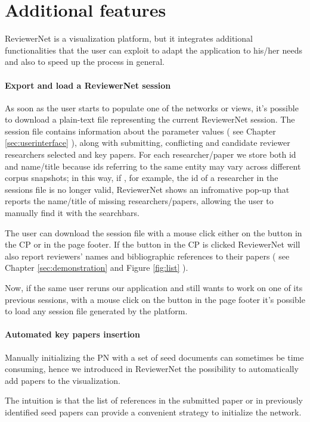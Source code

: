 \section{Additional features}\label{sec:misccode}
ReviewerNet is a visualization platform, but it integrates additional functionalities that the user can exploit to adapt the application to his/her needs and also to speed up the process in general.

\paragraph*{Export and load a ReviewerNet session}
As soon as the user starts to populate one of the networks or views, it's possible to download a plain-text file representing the current ReviewerNet session. The session file contains information about the parameter values ( see Chapter \ref{sec:userinterface} ), along with submitting, conflicting and candidate reviewer researchers selected and key papers. For each researcher/paper we store both id and name/title because ids referring to the same entity may vary across different corpus snapshots; in this way, if , for example, the id of a researcher in the sessions file is no longer valid, ReviewerNet shows an infromative pop-up that reports the name/title of missing researchers/papers, allowing the user to manually find it with the searchbars.     

The user can download the session file with a mouse click either on the  button in the CP or in the page footer. If the button in the CP is clicked ReviewerNet will also report reviewers’ names and bibliographic references to their papers ( see Chapter \ref{sec:demonstration} and Figure \ref{fig:list} ).

Now, if the same user reruns our application and still wants to work on one of its previous sessions, with a mouse click on the  button in the page footer it's possible to load any session file generated by the platform.

\paragraph*{Automated key papers insertion}
Manually initializing the PN with a set of seed documents can sometimes be time consuming, hence we introduced in ReviewerNet the possibility to automatically add papers to the visualization. 

The intuition is that the list of references in the submitted paper or in previously identified seed papers can provide a convenient strategy to initialize the network.

